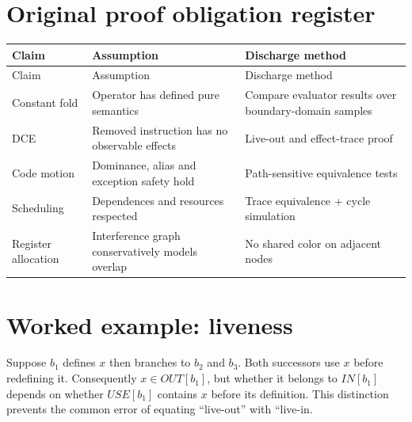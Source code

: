 \documentclass[10pt,letterpaper]{article}
\begin{document}
\section{Original proof obligation register}
\begin{longtable}{|>{\raggedright\arraybackslash}p{}|>{\raggedright\arraybackslash}p{}|>{\raggedright\arraybackslash}p{}|}
\hline
Claim & Assumption & Discharge method\\ \hline\endfirsthead
\hline
Claim & Assumption & Discharge method\\ \hline\endhead
Constant fold & Operator has defined pure semantics & Compare evaluator results over boundary-domain samples\\ \hline
DCE & Removed instruction has no observable effects & Live-out and effect-trace proof\\ \hline
Code motion & Dominance, alias and exception safety hold & Path-sensitive equivalence tests\\ \hline
Scheduling & Dependences and resources respected & Trace equivalence + cycle simulation\\ \hline
Register allocation & Interference graph conservatively models overlap & No shared color on adjacent nodes\\ \hline
\end{longtable}

\section{Worked example: liveness}
Suppose $b_1$ defines $x$ then branches to $b_2$ and $b_3$. Both successors use $x$ before redefining it. Consequently $x\in OUT[b_1]$, but whether it belongs to $IN[b_1]$ depends on whether $USE[b_1]$ contains $x$ before its definition. This distinction prevents the common error of equating ``live-out'' with ``live-in.
\end{document}
